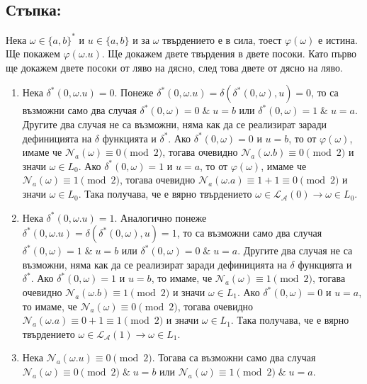 \documentclass[12pt]{article}
\begin{document}
\subsection*{Стъпка:}
Нека \(\omega \in \{a, b\}^*\) и \(u \in \{a, b\}\) и за \(\omega\) твърдението е в сила,
тоест \(\varphi(\omega)\) е истина. Ще покажем \(\varphi(\omega.u)\).
Ще докажем двете твърдения в двете посоки.
Като първо ще докажем двете посоки от ляво на дясно, след това двете от дясно на ляво.
\begin{enumerate}
    \item Нека \(\delta^*(0, \omega.u) = 0\).
    Понеже \(\delta^*(0, \omega.u) = \delta(\delta^*(0, \omega), u) = 0\),
    то са възможни само два случая \(\delta^*(0, \omega) = 0 \; \& \; u = b\) или 
    \(\delta^*(0, \omega) = 1 \; \& \; u = a\). Другите два случая не са възможни, няма как да се реализират заради дефиницията на \(\delta\) функцията и \(\delta^*\).
    Ако \(\delta^*(0, \omega) = 0\) и \(u = b\), то от \(\varphi(\omega)\), имаме че \(\mathcal{N}_a(\omega) \equiv 0 \pmod{2}\), тогава очевидно \(\mathcal{N}_a(\omega.b) \equiv 0 \pmod{2}\)
    и значи \(\omega \in L_0\).
    Ако \(\delta^*(0, \omega) = 1\) и \(u = a\), то от \(\varphi(\omega)\), имаме че \(\mathcal{N}_a(\omega) \equiv 1 \pmod{2}\), тогава очевидно \(\mathcal{N}_a(\omega.a) \equiv 1 + 1 \equiv 0 \pmod{2}\)
    и значи \(\omega \in L_0\).
    Така получава, че е вярно твърдението
    \(\omega \in \mathcal{L}_\mathcal{A}(0) \longrightarrow \omega \in L_0\).
    \item Нека \(\delta^*(0, \omega.u) = 1\). Аналогично 
    понеже \(\delta^*(0, \omega.u) = \delta(\delta^*(0, \omega), u) = 1\),
    то са възможни само два случая \(\delta^*(0, \omega) = 1 \; \& \; u = b\) или 
    \(\delta^*(0, \omega) = 0 \; \& \; u = a\). Другите два случая не са възможни, няма как да се реализират заради дефиницията на \(\delta\) функцията и \(\delta^*\).
    Ако \(\delta^*(0, \omega) = 1\) и \(u = b\), то имаме, че \(\mathcal{N}_a(\omega) \equiv 1 \pmod{2}\), тогава очевидно \(\mathcal{N}_a(\omega.b) \equiv 1 \pmod{2}\)
    и значи \(\omega \in L_1\).
    Ако \(\delta^*(0, \omega) = 0\) и \(u = a\), то имаме, че \(\mathcal{N}_a(\omega) \equiv 0 \pmod{2}\), тогава очевидно \(\mathcal{N}_a(\omega.a) \equiv 0 + 1 \equiv 1 \pmod{2}\)
    и значи \(\omega \in L_1\).
    Така получава, че е вярно твърдението
    \(\omega \in \mathcal{L}_\mathcal{A}(1) \longrightarrow \omega \in L_1\).
    \item Нека \(\mathcal{N}_a(\omega.u) \equiv 0 \pmod{2}\). Тогава са възможни само два случая \(\mathcal{N}_a(\omega) \equiv 0 \pmod{2} \; \& \; u = b\) или \(\mathcal{N}_a(\omega) \equiv 1 \pmod{2} \; \& \; u = a\).

\end{enumerate}
\end{document}
